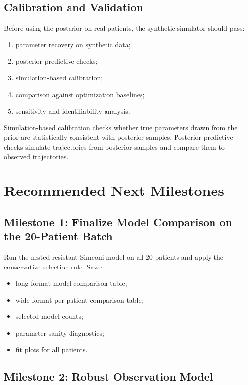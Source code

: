 \documentclass[11pt,a4paper]{article}
\begin{document}
\subsection{Calibration and Validation}

Before using the posterior on real patients, the synthetic simulator should pass:
\begin{enumerate}[leftmargin=2em]
    \item parameter recovery on synthetic data;
    \item posterior predictive checks;
    \item simulation-based calibration;
    \item comparison against optimization baselines;
    \item sensitivity and identifiability analysis.
\end{enumerate}

Simulation-based calibration checks whether true parameters drawn from the prior are statistically consistent with posterior samples. Posterior predictive checks simulate trajectories from posterior samples and compare them to observed trajectories.

\section{Recommended Next Milestones}

\subsection{Milestone 1: Finalize Model Comparison on the 20-Patient Batch}

Run the nested resistant-Simeoni model on all 20 patients and apply the conservative selection rule. Save:
\begin{itemize}[leftmargin=2em]
    \item long-format model comparison table;
    \item wide-format per-patient comparison table;
    \item selected model counts;
    \item parameter sanity diagnostics;
    \item fit plots for all patients.
\end{itemize}

\subsection{Milestone 2: Robust Observation Model}
\end{document}
